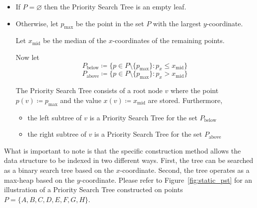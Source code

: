 \documentclass[twoside,11pt,openright]{report}
\begin{document}
\begin{itemize}
	\item If $P = \varnothing$ then the Priority Search Tree is an empty leaf.
	\item Otherwise, let $p_\text{max}$ be the point in the set $P$ with the largest $y$-coordinate.
	
			Let $x_{\text{mid}}$ be the median of the $x$-coordinates of the remaining points.
			
			Now let
			$$ P_\text{below} \coloneqq \{p \in P \setminus \{p_\text{max} \} : p_x \leq x_\text{mid} \}$$
			$$ P_\text{above} \coloneqq \{p \in P \setminus \{p_\text{max} \} : p_x > x_\text{mid} \}$$
			
			The Priority Search Tree consists of a root node $v$ where the point \\
			$p(v) \coloneqq p_{\text{max}}$ and the value $x(v) \coloneqq x_{\text{mid}}$ are stored. Furthermore,
			\begin{itemize}[label=$\bullet$]
				\item the left subtree of $v$ is a Priority Search Tree for the set $P_{\text{below}}$
				\item the right subtree of $v$ is a Priority Search Tree for the set $P_{\text{above}}$
			\end{itemize}
\end{itemize}

What is important to note is that the specific construction method allows the data structure to be indexed in two different ways. First, the tree can be searched as a binary search tree based on the $x$-coordinate. Second, the tree operates as a max-heap based on the $y$-coordinate. Please refer to Figure~\ref{fig:static_pst} for an illustration of a Priority Search Tree constructed on points $P = \{A, B, C, D, E, F, G, H\}$.
\end{document}
